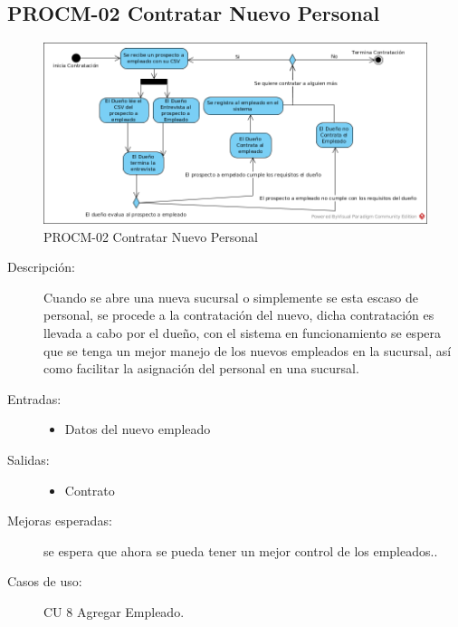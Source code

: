 \subsection{PROCM-02 Contratar Nuevo Personal}

\begin{figure}[htbp]
	\begin{center}
		\includegraphics[width=.8\textwidth]{images/TOBEprocContratacion}
		\caption{PROCM-02 Contratar Nuevo Personal}
		\label{fig:proceso3}
	\end{center}
\end{figure}

\begin{description}
	\item[Descripción:]Cuando se abre una nueva sucursal o simplemente se esta escaso de personal, se procede a la contratación del nuevo, dicha contratación es llevada a cabo por el dueño, con el sistema en funcionamiento se espera que se tenga un mejor manejo de los nuevos empleados en la sucursal, así como facilitar la asignación del personal en una sucursal.
	\item[Entradas:] \cdtEmpty
        \begin{itemize}
			\item Datos del nuevo empleado
        \end{itemize}
	\item[Salidas:] \cdtEmpty
        \begin{itemize}
			\item Contrato
        \end{itemize}	
    \item[Mejoras esperadas:] se espera que ahora se pueda tener un mejor control de los empleados..
    \item[Casos de uso:]CU 8 Agregar Empleado.
\end{description}

